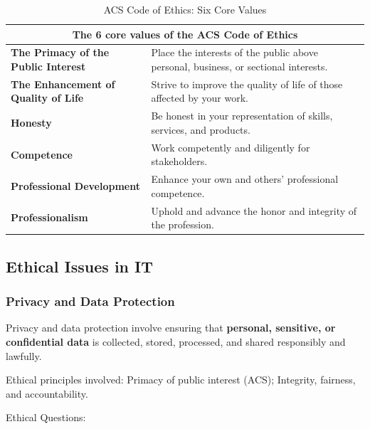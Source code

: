 \begin{table}[htbp]
\centering
\renewcommand{\arraystretch}{1.35}
\begin{tabular}{|p{4.5cm}|p{10cm}|}
\hline
\multicolumn{2}{|c|}{\textbf{The 6 core values of the ACS Code of Ethics}} \\
\hline

\textbf{The Primacy of the Public Interest} &
Place the interests of the public above personal, business, or sectional interests. \\
\hline

\textbf{The Enhancement of Quality of Life} &
Strive to improve the quality of life of those affected by your work. \\
\hline

\textbf{Honesty} &
Be honest in your representation of skills, services, and products. \\
\hline

\textbf{Competence} &
Work competently and diligently for stakeholders. \\
\hline

\textbf{Professional Development} &
Enhance your own and others’ professional competence. \\
\hline

\textbf{Professionalism} &
Uphold and advance the honor and integrity of the profession. \\
\hline

\end{tabular}
\caption{ACS Code of Ethics: Six Core Values}
\end{table}

\subsection{Ethical Issues in IT}

\subsubsection{Privacy and Data Protection}

\indent 

Privacy and data protection involve ensuring that \textbf{personal, sensitive, or confidential data} is collected, stored, processed, and shared responsibly and lawfully.

Ethical principles involved: Primacy of public interest (ACS); Integrity, fairness, and accountability.

Ethical Questions:

